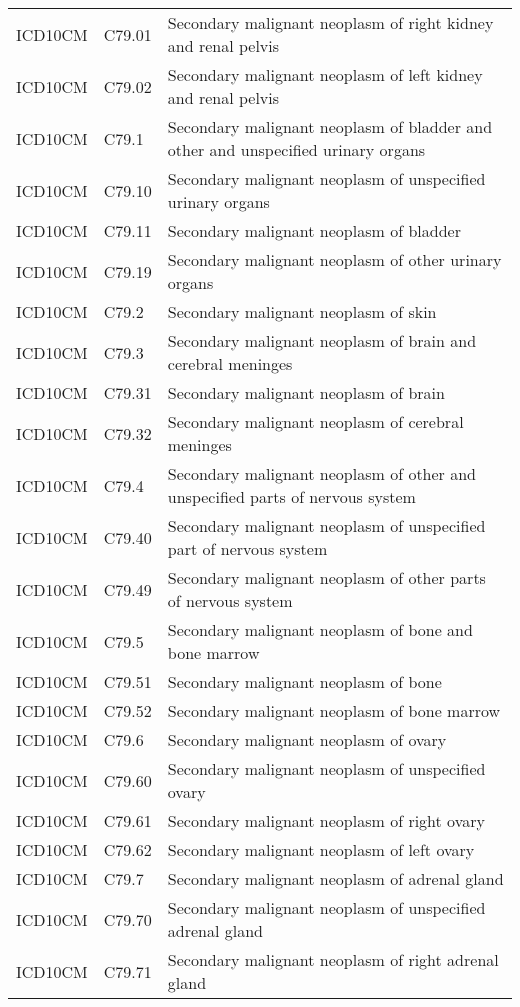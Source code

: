 \begin{longtable}{p{}p{}p{}}
  ICD10CM & C79.01 & Secondary malignant neoplasm of right kidney and renal pelvis \\ 
  ICD10CM & C79.02 & Secondary malignant neoplasm of left kidney and renal pelvis \\ 
  ICD10CM & C79.1 & Secondary malignant neoplasm of bladder and other and unspecified urinary organs \\ 
  ICD10CM & C79.10 & Secondary malignant neoplasm of unspecified urinary organs \\ 
  ICD10CM & C79.11 & Secondary malignant neoplasm of bladder \\ 
  ICD10CM & C79.19 & Secondary malignant neoplasm of other urinary organs \\ 
  ICD10CM & C79.2 & Secondary malignant neoplasm of skin \\ 
  ICD10CM & C79.3 & Secondary malignant neoplasm of brain and cerebral meninges \\ 
  ICD10CM & C79.31 & Secondary malignant neoplasm of brain \\ 
  ICD10CM & C79.32 & Secondary malignant neoplasm of cerebral meninges \\ 
  ICD10CM & C79.4 & Secondary malignant neoplasm of other and unspecified parts of nervous system \\ 
  ICD10CM & C79.40 & Secondary malignant neoplasm of unspecified part of nervous system \\ 
  ICD10CM & C79.49 & Secondary malignant neoplasm of other parts of nervous system \\ 
  ICD10CM & C79.5 & Secondary malignant neoplasm of bone and bone marrow \\ 
  ICD10CM & C79.51 & Secondary malignant neoplasm of bone \\ 
  ICD10CM & C79.52 & Secondary malignant neoplasm of bone marrow \\ 
  ICD10CM & C79.6 & Secondary malignant neoplasm of ovary \\ 
  ICD10CM & C79.60 & Secondary malignant neoplasm of unspecified ovary \\ 
  ICD10CM & C79.61 & Secondary malignant neoplasm of right ovary \\ 
  ICD10CM & C79.62 & Secondary malignant neoplasm of left ovary \\ 
  ICD10CM & C79.7 & Secondary malignant neoplasm of adrenal gland \\ 
  ICD10CM & C79.70 & Secondary malignant neoplasm of unspecified adrenal gland \\ 
  ICD10CM & C79.71 & Secondary malignant neoplasm of right adrenal gland \\ 

\end{longtable}
